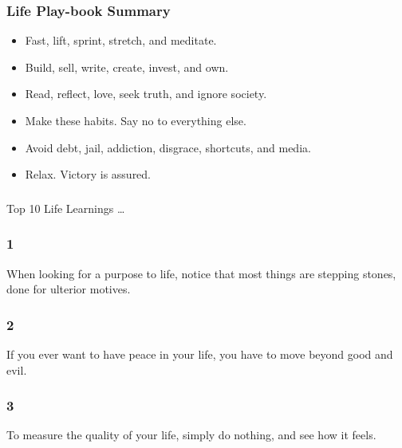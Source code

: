 \begin{frame}[fragile]\frametitle{Life Play-book Summary}

\begin{itemize}
\item Fast, lift, sprint, stretch, and meditate.
\item Build, sell, write, create, invest, and own.
\item Read, reflect, love, seek truth, and ignore society.
\item Make these habits. Say no to everything else.
\item Avoid debt, jail, addiction, disgrace, shortcuts, and media.
\item Relax. Victory is assured.
\end{itemize}

\end{frame}

\begin{frame}[fragile]\frametitle{}
\begin{center}
{\Large Top 10 Life Learnings \ldots }

\end{center}
\end{frame}

\begin{frame}[fragile]\frametitle{1}
\begin{center}
When looking for a purpose to life, notice that most things are stepping stones, done for ulterior motives.
\end{center}
\end{frame}

\begin{frame}[fragile]\frametitle{2}
\begin{center}
If you ever want to have peace in your life, you have to move beyond good and evil.
\end{center}
\end{frame}

\begin{frame}[fragile]\frametitle{3}
\begin{center}
 To measure the quality of your life, simply do nothing, and see how it feels.
\end{center}
\end{frame}

